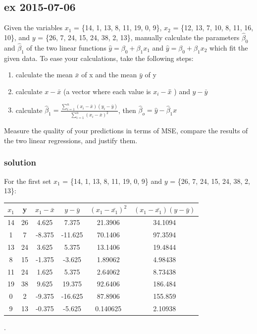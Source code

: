 \documentclass[a4paper,12pt,titlepage]{article} %
\begin{document}
\subsection{ex 2015-07-06}
Given the variables $ x_{1} $ = \{14, 1, 13, 8, 11, 19, 0, 9\}, $ x_{2} $ = \{12, 13, 7, 10, 8, 11, 16, 10\}, and $ y $ = \{26, 7, 24, 15, 24, 38, 2, 13\}, manually calculate the parameters $ \hat{\beta}_{0} $ and $ \hat{\beta}_{1} $ of the two linear functions $ \hat{y} = \beta_{0} + \beta_{1} x_{1} $ and $ \hat{y} = \beta_{0} + \beta_{1} x_{2} $ which fit the given data. To ease your calculations, take the following steps:
\begin{enumerate}
\item calculate the mean $ \bar{x} $ of x and the mean $ \bar{y} $ of y
\item calculate $ x - \bar{x} $ (a vector where each value is $ x_{i} - \bar{x} $̄ ) and $ y - \bar{y} $  
\item calculate $ \hat{\beta}_{1} = \frac{\sum_{i=1}^{n} (x_{i}-\bar{x}) (y_{i}-\bar{y})}{ \sum_{i=1}^{n} (x_{i}-\bar{x})^{2} } $, then $ \hat{\beta}_{o} = \hat{y} - \hat{\beta}_{1} x $
\end{enumerate}
Measure the quality of your predictions in terms of MSE, compare the results of the two
linear regressions, and justify them.

\subsubsection{solution}
For the first set $ x_{1} $ = \{14, 1, 13, 8, 11, 19, 0, 9\} and $ y $ = \{26, 7, 24, 15, 24, 38, 2, 13\}:\\
  \begin{tabular}{|c|c|c|c|c|c|}
    \hline
    $ x_1  $ & y & $ x_1 - \bar{x} $ & $ y - \bar{y} $ & $ (x_1 - \bar{x_1})^{2} $ & $ (x_1 - \bar{x_1})(y - \bar{y}) $ \\
    \hline
    14	& 26	& 4.625 	& 7.375 	& 21.3906	& 34.1094	\\
    \hline
    1	& 7	& -8.375	& -11.625	& 70.1406	& 97.3594	\\
    \hline
    13	& 24	& 3.625 	& 5.375 	& 13.1406	& 19.4844	\\
    \hline
    8	& 15	& -1.375	& -3.625	& 1.89062	& 4.98438	\\
    \hline
    11	& 24	& 1.625 	& 5.375 	& 2.64062	& 8.73438	\\
    \hline
    19	& 38	& 9.625 	& 19.375	& 92.6406	& 186.484	\\
    \hline
    0	& 2	& -9.375	& -16.625	& 87.8906	& 155.859	\\
    \hline
    9	& 13	& -0.375	& -5.625	& 0.140625	& 2.10938	\\
    \hline
  \end{tabular}
.\\
\end{document}
